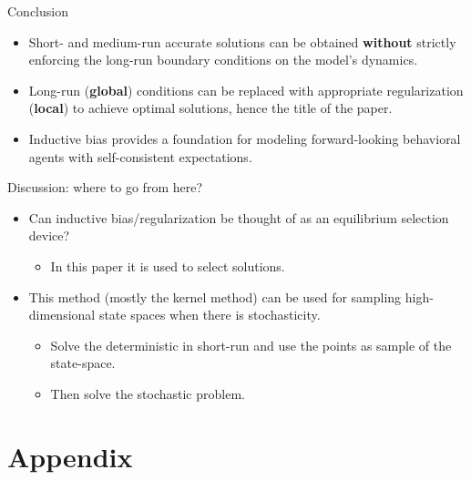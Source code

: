 \documentclass[aspectratio=169,10pt]{beamer}
\newcommand{\emphcolor}[1]{\textbf{\textcolor{emphcolorval}{#1}}}
\begin{document}
\begin{frame}{Conclusion}
	\begin{itemize}
		\item Short- and medium-run accurate solutions can be obtained \emphcolor{without} strictly enforcing the long-run boundary  conditions on the model’s dynamics.
		\vspace{0.1in}
		\item Long-run (\emphcolor{global}) conditions can be replaced with appropriate regularization (\emphcolor{local}) to achieve optimal solutions, hence the title of the paper.
		\vspace{0.1in}
		\item Inductive bias provides a foundation for modeling forward-looking behavioral agents with self-consistent expectations.
	\end{itemize}
\end{frame}

\begin{frame}{Discussion: where to go from here?}
	\begin{itemize}
		\item Can inductive bias/regularization be thought of as an equilibrium selection device?
		\begin{itemize}
			\item In this paper it is used to select solutions.
		\end{itemize}
		\smallskip
		\item This method (mostly the kernel method) can be used for sampling high-dimensional state spaces when there is stochasticity. 
		\begin{itemize}
		\item Solve the deterministic in short-run and use the points as sample of the state-space.
		\smallskip
		\item Then solve the stochastic problem.
		\end{itemize}
	\end{itemize}
\end{frame}
\section{Appendix}
\end{document}
